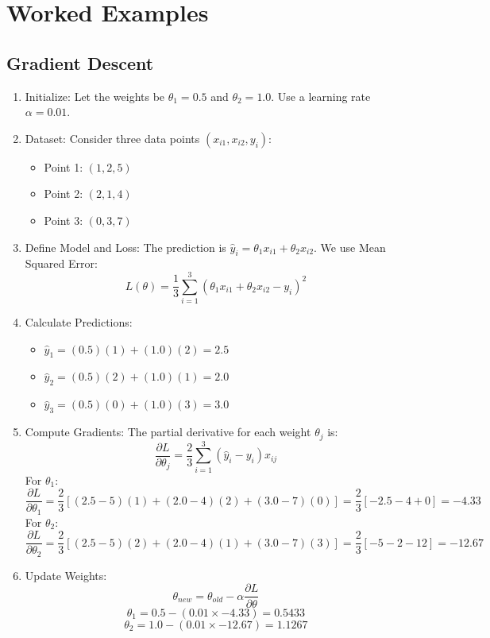 \section{Worked Examples}

\bigskip

\subsection{Gradient Descent}
\label{worked-gradient-descent}

\medskip

\begin{enumerate}
    \setlength{\itemsep}{1em}
    \item Initialize: Let the weights be $\theta_1 = 0.5$ and $\theta_2 = 1.0$. Use a learning rate $\alpha = 0.01$.
    \item Dataset: Consider three data points $(x_{i1}, x_{i2}, y_i)$:
    \begin{itemize}
        \item Point 1: $(1, 2, 5)$
        \item Point 2: $(2, 1, 4)$
        \item Point 3: $(0, 3, 7)$
    \end{itemize}
    \item Define Model and Loss: The prediction is $\hat{y}_i = \theta_1 x_{i1} + \theta_2 x_{i2}$. We use Mean Squared Error:
    $$L(\theta) = \frac{1}{3} \sum_{i=1}^3 (\theta_1 x_{i1} + \theta_2 x_{i2} - y_i)^2$$
    \item Calculate Predictions:
    \begin{itemize}
        \item $\hat{y}_1 = (0.5)(1) + (1.0)(2) = 2.5$
        \item $\hat{y}_2 = (0.5)(2) + (1.0)(1) = 2.0$
        \item $\hat{y}_3 = (0.5)(0) + (1.0)(3) = 3.0$
    \end{itemize}
    \item Compute Gradients: The partial derivative for each weight $\theta_j$ is:
    $$\frac{\partial L}{\partial \theta_j} = \frac{2}{3} \sum_{i=1}^3 (\hat{y}_i - y_i)x_{ij}$$
    For $\theta_1$:
    $$\frac{\partial L}{\partial \theta_1} = \frac{2}{3} [(2.5-5)(1) + (2.0-4)(2) + (3.0-7)(0)] = \frac{2}{3} [-2.5 - 4 + 0] = -4.33$$
    For $\theta_2$:
    $$\frac{\partial L}{\partial \theta_2} = \frac{2}{3} [(2.5-5)(2) + (2.0-4)(1) + (3.0-7)(3)] = \frac{2}{3} [-5 - 2 - 12] = -12.67$$
    \item Update Weights:
    $$\theta_{new} = \theta_{old} - \alpha \frac{\partial L}{\partial \theta}$$
    $$\theta_1 = 0.5 - (0.01 \times -4.33) = 0.5433$$
    $$\theta_2 = 1.0 - (0.01 \times -12.67) = 1.1267$$
\end{enumerate}


